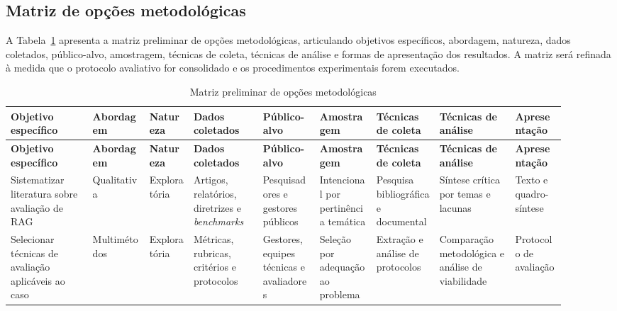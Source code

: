 \subsection{Matriz de opções metodológicas}

A Tabela~\ref{tab:matriz-metodologica} apresenta a matriz preliminar de opções metodológicas, articulando objetivos específicos, abordagem, natureza, dados coletados, público-alvo, amostragem, técnicas de coleta, técnicas de análise e formas de apresentação dos resultados. A matriz será refinada à medida que o protocolo avaliativo for consolidado e os procedimentos experimentais forem executados.

\begin{landscape}
\begingroup
\scriptsize
\setlength{\tabcolsep}{1.5pt}
\begin{longtable}{@{}>{\raggedright\arraybackslash}p{0.13\linewidth}>{\raggedright\arraybackslash}p{0.095\linewidth}>{\raggedright\arraybackslash}p{0.075\linewidth}>{\raggedright\arraybackslash}p{0.115\linewidth}>{\raggedright\arraybackslash}p{0.095\linewidth}>{\raggedright\arraybackslash}p{0.09\linewidth}>{\raggedright\arraybackslash}p{0.105\linewidth}>{\raggedright\arraybackslash}p{0.125\linewidth}>{\raggedright\arraybackslash}p{0.085\linewidth}@{}}
\caption{Matriz preliminar de opções metodológicas}
\label{tab:matriz-metodologica}\\
\toprule
\textbf{Objetivo específico} & \textbf{Abordagem} & \textbf{Natureza} & \textbf{Dados coletados} & \textbf{Público-alvo} & \textbf{Amostragem} & \textbf{Técnicas de coleta} & \textbf{Técnicas de análise} & \textbf{Apresentação} \\
\midrule
\endfirsthead
\toprule
\textbf{Objetivo específico} & \textbf{Abordagem} & \textbf{Natureza} & \textbf{Dados coletados} & \textbf{Público-alvo} & \textbf{Amostragem} & \textbf{Técnicas de coleta} & \textbf{Técnicas de análise} & \textbf{Apresentação} \\
\midrule
\endhead
Sistematizar literatura sobre avaliação de RAG & Qualitativa & Exploratória & Artigos, relatórios, diretrizes e \textit{benchmarks} & Pesquisadores e gestores públicos & Intencional por pertinência temática & Pesquisa bibliográfica e documental & Síntese crítica por temas e lacunas & Texto e quadro-síntese \\
Selecionar técnicas de avaliação aplicáveis ao caso & Multimétodos & Exploratória & Métricas, rubricas, critérios e protocolos & Gestores, equipes técnicas e avaliadores & Seleção por adequação ao problema & Extração e análise de protocolos & Comparação metodológica e análise de viabilidade & Protocolo de avaliação \\

\end{longtable}
\end{landscape}
